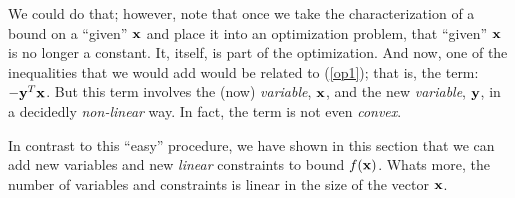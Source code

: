 \documentclass[12pt]{article}
\begin{document}
We could do that; however, note that once we take the characterization of a bound on a ``given'' ${\bf x}$ 
and place it into an optimization problem, that ``given'' ${\bf x}$ is no longer a constant.
It, itself, is part of the optimization. And now, one of the inequalities that we would add
would be related to (\ref{op1}); that is, the term: $-{\bf y}^T {\bf x}$. But this term
involves the (now) {\it variable\/}, ${\bf x}$, and the new {\it variable\/}, ${\bf y}$, in a decidedly {\it non-linear\/} way.
In fact, the term is not even {\it convex\/}.

In contrast to this ``easy'' procedure, we have shown in this section that 
we can add new variables and new {\it linear\/} constraints to bound $f({\bf x})$.
Whats more, the number of variables and constraints is linear in the size of the vector ${\bf x}$.
\end{document}

